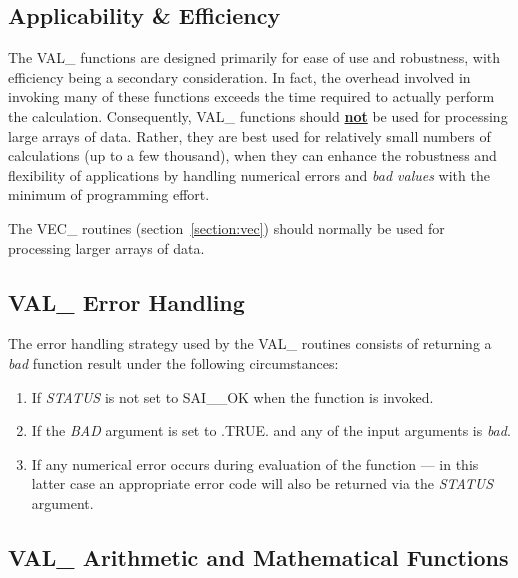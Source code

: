 \documentclass[11pt,nolof]{starlink}
\providecommand{\name}[1]{\mbox{#1}}
\providecommand{\fortvar}[1]{\mbox{\emph{#1}}}
\begin{document}
\subsection{Applicability \& Efficiency}

The \name{VAL\_} functions are designed primarily for ease of use and
robustness, with efficiency being a secondary consideration.
In fact, the
overhead involved in invoking many of these functions exceeds the time
required to actually perform the calculation.
Consequently, \name{VAL\_} functions should \textbf{\underline{not}} be used
for processing large arrays of data.
Rather, they are best used for relatively small numbers of calculations (up
to a few thousand), when they can enhance the robustness and flexibility of
applications by handling numerical errors and \emph{bad values} with the
minimum of programming effort.

The \name{VEC\_} routines (section~\ref{section:vec}) should normally be
used for processing larger arrays of data.

\subsection{\name{VAL\_} Error Handling}
\label{section:val:error}

The error handling strategy used by the \name{VAL\_} routines consists of
returning a \emph{bad} function result under the following circumstances:

\begin{enumerate}

\item If \fortvar{STATUS} is not set to \name{SAI\_\_OK} when the function
is invoked.

\item If the \fortvar{BAD} argument is set to \name{.TRUE.} and any of
the input arguments is \emph{bad}.

\item If any numerical error occurs during evaluation of the function --- in
this latter case an appropriate error code will also be returned via the
\fortvar{STATUS} argument.

\end{enumerate}

\subsection{\name{VAL\_} Arithmetic and Mathematical Functions}
\end{document}
